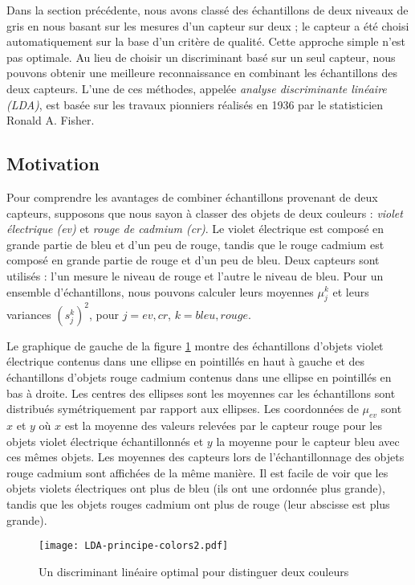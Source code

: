 Dans la section précédente, nous avons classé des échantillons de deux niveaux de gris en nous basant sur les mesures d'un capteur sur deux ; le capteur a été choisi automatiquement sur la base d'un critère de qualité. Cette approche simple n'est pas optimale. Au lieu de choisir un discriminant basé sur un seul capteur, nous pouvons obtenir une meilleure reconnaissance en combinant les échantillons des deux capteurs. L'une de ces méthodes, appelée \emph{analyse discriminante linéaire (LDA)}, est basée sur les travaux pionniers réalisés en 1936 par le statisticien Ronald A. Fisher.

\subsection{Motivation}

Pour comprendre les avantages de combiner échantillons provenant de deux capteurs, supposons que nous sayon à classer des objets de deux couleurs : \emph{violet électrique (ev)} et \emph{rouge de cadmium (cr)}. Le violet électrique est composé en grande partie de bleu et d'un peu de rouge, tandis que le rouge cadmium est composé en grande partie de rouge et d'un peu de bleu. Deux capteurs sont utilisés : l'un mesure le niveau de rouge et l'autre le niveau de bleu. Pour un ensemble d'échantillons, nous pouvons calculer leurs moyennes $\mu_j^k$ et leurs variances $(s_j^k)^2$, pour $j=\mathit{ev}, \mathit{cr}$, $k=\mathit{bleu}, \mathit{rouge}$.

Le graphique de gauche de la figure \ref{fig.LDAprincipe} montre des échantillons d'objets violet électrique contenus dans une ellipse en pointillés en haut à gauche et des échantillons d'objets rouge cadmium contenus dans une ellipse en pointillés en bas à droite. Les centres des ellipses sont les moyennes car les échantillons sont distribués symétriquement par rapport aux ellipses. Les coordonnées de $\mu_{ev}$ sont $x$ et $y$ où $x$ est la moyenne des valeurs relevées par le capteur rouge pour les objets violet électrique échantillonnés et $y$ la moyenne pour le capteur bleu avec ces mêmes objets. Les moyennes des capteurs lors de l'échantillonnage des objets rouge cadmium sont affichées de la même manière. Il est facile de voir que les objets violets électriques ont plus de bleu (ils ont une ordonnée plus grande), tandis que les objets rouges cadmium ont plus de rouge (leur abscisse est plus grande).

\begin{figure}
\begin{center}
\texttt{[image: LDA-principe-colors2.pdf]}
\end{center}
\caption{Un discriminant linéaire optimal pour distinguer deux couleurs}\label{fig.LDAprincipe}
\end{figure}

